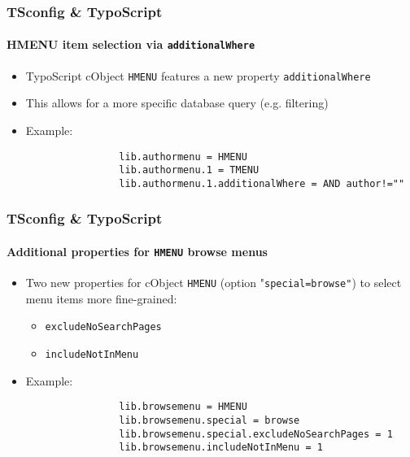 \begin{frame}[fragile]
	\frametitle{TSconfig \& TypoScript}
	\framesubtitle{HMENU item selection via \texttt{additionalWhere}}

	\begin{itemize}

		\item TypoScript cObject \texttt{HMENU} features a new property \texttt{additionalWhere}
		\item This allows for a more specific database query (e.g. filtering)

		\item Example:

			\begin{lstlisting}
				lib.authormenu = HMENU
				lib.authormenu.1 = TMENU
				lib.authormenu.1.additionalWhere = AND author!=""
			\end{lstlisting}

	\end{itemize}

\end{frame}


\begin{frame}[fragile]
	\frametitle{TSconfig \& TypoScript}
	\framesubtitle{Additional properties for \texttt{HMENU} browse menus}

	\begin{itemize}
		\item Two new properties for cObject \texttt{HMENU} (option "\texttt{special=browse"})\newline
			to select menu items more fine-grained:
		
			\begin{itemize}
				\item \texttt{excludeNoSearchPages}
				\item \texttt{includeNotInMenu}
			\end{itemize}

		\item Example:

			\begin{lstlisting}
				lib.browsemenu = HMENU
				lib.browsemenu.special = browse
				lib.browsemenu.special.excludeNoSearchPages = 1
				lib.browsemenu.includeNotInMenu = 1
			\end{lstlisting}

	\end{itemize}

\end{frame}

